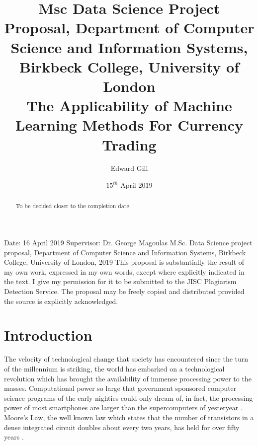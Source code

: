 \documentclass[11pt, a4paper]{article}
\title{Msc Data Science Project Proposal, Department of Computer Science and Information Systems, Birkbeck College, University of London\\ \textbf{The Applicability of Machine Learning Methods For Currency Trading} }
\author{Edward Gill } %
\date{ $15^{th}$ April 2019}
\begin{document}
\maketitle

\begin{abstract}
To be decided closer to the completion date
\end{abstract}
Date: 16 April 2019\newline
Supervisor: Dr. George Magoulas \newline
M.Sc. Data Science project proposal, Department of Computer Science and Information Systems, Birkbeck College, University of London, 2019
This proposal is substantially the result of my own work, expressed in my own words, except where explicitly indicated in the text. I give my permission for it to be submitted to the JISC Plagiarism Detection Service.
The proposal may be freely copied and distributed provided the source is explicitly acknowledged.


\clearpage
\tableofcontents

\clearpage


\section{Introduction}

The velocity of technological change that society has encountered since the turn of the millennium is striking, the world has embarked on a technological revolution which has brought the availability of immense processing power to the masses. Computational power so large that government sponsored computer science programs of the early nighties could only dream of, in fact, the processing power of most smartphones are larger than the supercomputers of yesteryear \cite{supercomp}.
\newline Moore's Law, the well known law which states that the number of transistors in a dense integrated circuit doubles about every two years, has held for over fifty years \cite{MacK2011}. 
\end{document}
